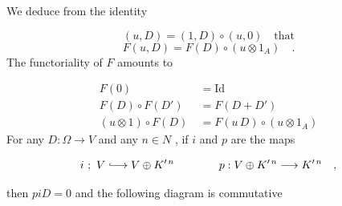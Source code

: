 We deduce from the identity

\begin{equation*}
(u, D) = (1, D) \circ (u, 0) \quad \text{that}
\end{equation*}
\begin{equation*}
F(u, D) = F(D) \circ (u \otimes 1_{A}) \quad .
\end{equation*}
The functoriality of  $F$  amounts to

\begin{equation*}
\begin{aligned}
F(0) &= \mathrm{Id} \\
F(D) \circ F(D') &= F(D + D') \\
(u \otimes 1) \circ F(D) \ &= F(u\,D) \circ (u \otimes 1_{A})
\end{aligned}
\end{equation*}
For any  $D : \Omega \rightarrow V$  and any  $n \in N$  , if  $i$  and  $p$  are the maps

\begin{equation*}
i \ ; \ V \lhook\joinrel\longrightarrow V \oplus K'^{\,n} \qquad\qquad p : V \oplus K'^{\,n} \longrightarrow K'^{\,n} \quad , 
\end{equation*}


 then  $p i D = 0$  and the following diagram is commutative

